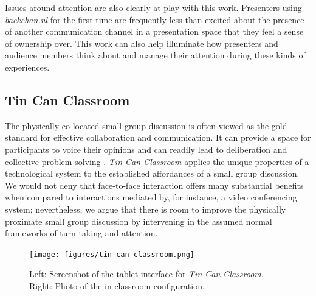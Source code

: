 \documentclass{tufte-handout}
\begin{document}
Issues around attention are also clearly at play with this work. Presenters using \emph{backchan.nl} for the first time are frequently less than excited about the presence of another communication channel in a presentation space that they feel a sense of ownership over. This work can also help illuminate how presenters and audience members think about and manage their attention during these kinds of experiences.



\subsection{Tin Can Classroom}


The physically co-located small group discussion is often viewed as the gold standard for effective collaboration and communication.  It can provide a space for participants to voice their opinions and can readily lead to deliberation and collective problem solving \citep{Burkhalter:2002vg}. \emph{Tin Can Classroom}  applies the unique properties of a technological system to the established affordances of a small group discussion. We would not deny that face-to-face interaction offers many substantial benefits when compared to interactions mediated by, for instance, a video conferencing system; nevertheless, we argue that there is room to improve the physically proximate small group discussion by intervening in the assumed normal frameworks of turn-taking and attention.

\begin{figure}[t]
	\texttt{[image: figures/tin-can-classroom.png]}
	\caption{Left: Screenshot of the tablet interface for \emph{Tin Can Classroom}. Right: Photo of the in-classroom configuration.}
	\label{fig:tin-can-classroom}
\end{figure}
\end{document}
